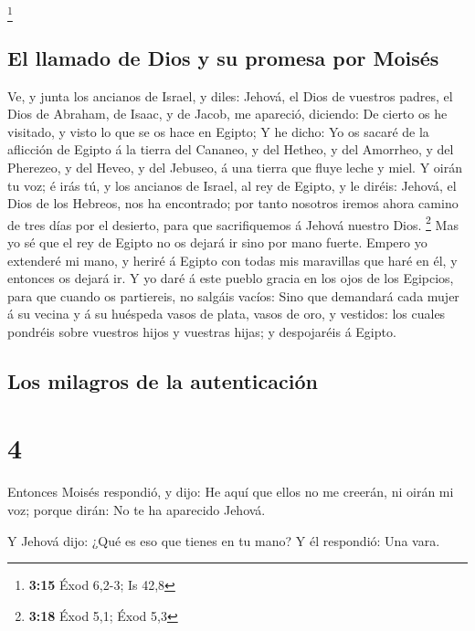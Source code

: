 \footnote{\textbf{3:15} Éxod 6,2-3; Is 42,8}

\hypertarget{el-llamado-de-dios-y-su-promesa-por-moisuxe9s}{%
\subsection{El llamado de Dios y su promesa por
Moisés}\label{el-llamado-de-dios-y-su-promesa-por-moisuxe9s}}

 Ve, y junta los ancianos de Israel, y diles: Jehová, el
Dios de vuestros padres, el Dios de Abraham, de Isaac, y de Jacob, me
apareció, diciendo: De cierto os he visitado, y visto lo que se os hace
en Egipto;  Y he dicho: Yo os sacaré de la aflicción de
Egipto á la tierra del Cananeo, y del Hetheo, y del Amorrheo, y del
Pherezeo, y del Heveo, y del Jebuseo, á una tierra que fluye leche y
miel.  Y oirán tu voz; é irás tú, y los ancianos de
Israel, al rey de Egipto, y le diréis: Jehová, el Dios de los Hebreos,
nos ha encontrado; por tanto nosotros iremos ahora camino de tres días
por el desierto, para que sacrifiquemos á Jehová nuestro Dios.
\footnote{\textbf{3:18} Éxod 5,1; Éxod 5,3}  Mas yo sé
que el rey de Egipto no os dejará ir sino por mano fuerte.
 Empero yo extenderé mi mano, y heriré á Egipto con todas
mis maravillas que haré en él, y entonces os dejará ir. 
Y yo daré á este pueblo gracia en los ojos de los Egipcios, para que
cuando os partiereis, no salgáis vacíos:  Sino que
demandará cada mujer á su vecina y á su huéspeda vasos de plata, vasos
de oro, y vestidos: los cuales pondréis sobre vuestros hijos y vuestras
hijas; y despojaréis á Egipto.

\hypertarget{los-milagros-de-la-autenticaciuxf3n}{%
\subsection{Los milagros de la
autenticación}\label{los-milagros-de-la-autenticaciuxf3n}}

\hypertarget{section-3}{%
\section{4}\label{section-3}}

 Entonces Moisés respondió, y dijo: He aquí que ellos no
me creerán, ni oirán mi voz; porque dirán: No te ha aparecido Jehová.

 Y Jehová dijo: ¿Qué es eso que tienes en tu mano? Y él
respondió: Una vara.

